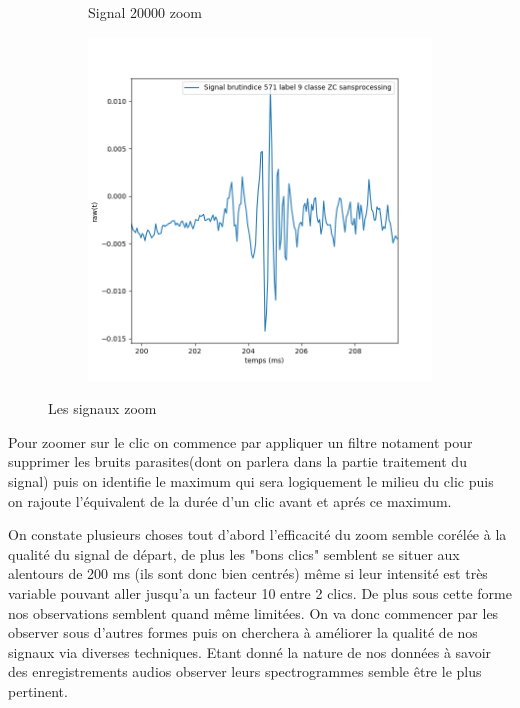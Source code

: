 \begin{figure}[!h]
\begin{subfigure}[b]{0.3\textwidth}
  \caption{Signal 20000 zoom}
  \end{subfigure}
  \begin{subfigure}[b]{0.3\textwidth}
    \includegraphics[width=\textwidth]{./images/indice571Spectro1Dlabel9classeZCsansprocessingaveczoom.png}
  \end{subfigure}
  \caption{Les signaux zoom}
\end{figure}

Pour zoomer sur le clic on commence par appliquer un filtre notament pour supprimer les bruits parasites(dont on parlera dans la partie traitement du signal) puis on identifie le maximum qui sera logiquement le milieu du clic puis on rajoute l'équivalent de la durée d'un clic avant et aprés ce maximum.

On constate plusieurs choses tout d'abord l'efficacité du zoom semble corélée à la qualité du signal de départ, de plus les "bons clics" semblent se situer aux alentours de 200 ms (ils sont donc bien centrés) même si leur intensité est très  variable pouvant aller jusqu'a un facteur 10 entre 2 clics. De plus sous cette forme nos observations semblent quand même limitées. On va donc commencer par les observer sous d'autres formes puis on cherchera à améliorer la qualité de nos signaux via diverses techniques. Etant donné la nature de nos données à savoir des enregistrements audios observer leurs spectrogrammes semble être le plus pertinent.

